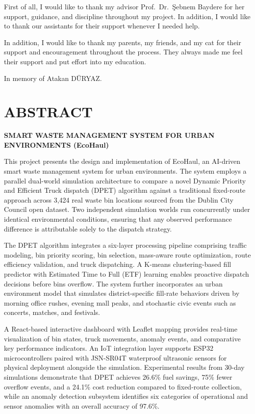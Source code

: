 \documentclass[12pt,a4paper]{report}
\begin{document}
\indent First of all, I would like to thank my advisor Prof.\ Dr.\ \c{S}ebnem Baydere for her support, guidance,
and discipline throughout my project. In addition, I would like to thank our assistants for
their support whenever I needed help.

In addition, I would like to thank my parents, my friends, and my cat for their support and encouragement throughout the process. They always made me feel their support and put effort into my education.

In memory of Atakan DÜRYAZ.




\clearpage
\chapter*{ABSTRACT}

\begin{center}
{\large\bfseries SMART WASTE MANAGEMENT SYSTEM FOR URBAN ENVIRONMENTS (EcoHaul)}
\end{center}
\vspace{0.8cm}

\indent This project presents the design and implementation of EcoHaul, an AI-driven smart waste management system for urban environments. The system employs a parallel dual-world simulation architecture to compare a novel Dynamic Priority and Efficient Truck dispatch (DPET) algorithm against a traditional fixed-route approach across 3,424 real waste bin locations sourced from the Dublin City Council open dataset. Two independent simulation worlds run concurrently under identical environmental conditions, ensuring that any observed performance difference is attributable solely to the dispatch strategy.

\indent The DPET algorithm integrates a six-layer processing pipeline comprising traffic modeling, bin priority scoring, bin selection, mass-aware route optimization, route efficiency validation, and truck dispatching. A K-means clustering-based fill predictor with Estimated Time to Full (ETF) learning enables proactive dispatch decisions before bins overflow. The system further incorporates an urban environment model that simulates district-specific fill-rate behaviors driven by morning office rushes, evening mall peaks, and stochastic civic events such as concerts, matches, and festivals.

\indent A React-based interactive dashboard with Leaflet mapping provides real-time visualization of bin states, truck movements, anomaly events, and comparative key performance indicators. An IoT integration layer supports ESP32 microcontrollers paired with JSN-SR04T waterproof ultrasonic sensors for physical deployment alongside the simulation. Experimental results from 30-day simulations demonstrate that DPET achieves 26.6\% fuel savings, 75\% fewer overflow events, and a 24.1\% cost reduction compared to fixed-route collection, while an anomaly detection subsystem identifies six categories of operational and sensor anomalies with an overall accuracy of 97.6\%.
\end{document}

